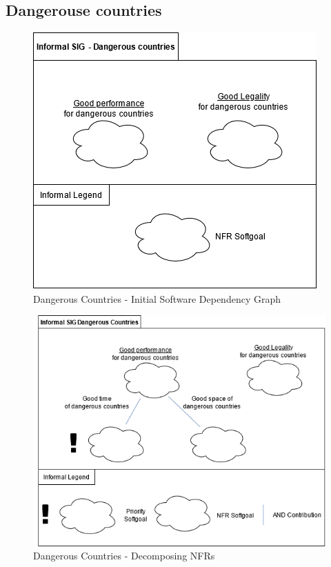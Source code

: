\documentclass{VUMIFPSkursinis}
\begin{document}
\begin{landscape}
	\subsection{Dangerouse countries}
		\begin{figure}[H]
			\center
			\includegraphics[scale=0.9]{img/Dangerous-Countries-1}
			\caption{Dangerous Countries - Initial Software Dependency Graph} %
			\label{img:kurimoProcesas}
		\end{figure}
		\begin{figure}[H]
			\center
			\includegraphics[scale=0.7]{img/Dangerous-Countries-2}
			\caption{Dangerous Countries - Decomposing NFRs} %
			\label{img:kurimoProcesas}
		\end{figure}	


\end{landscape}
\end{document}
